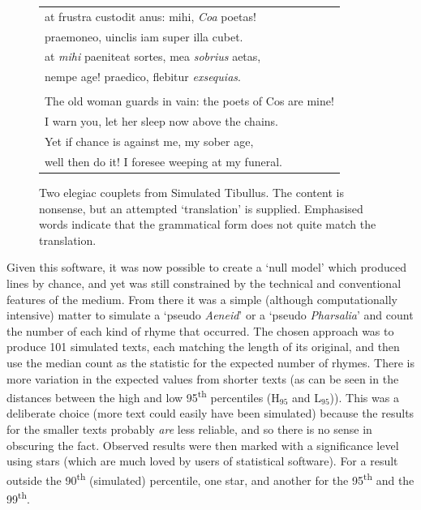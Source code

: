 \documentclass[twocolumn, switch]{article} %
\begin{document}
\begin{figure}[h!]
\caption{
Two elegiac couplets from Simulated Tibullus. The content is nonsense, but an
attempted `translation' is supplied. Emphasised words indicate that the
grammatical form does not quite match the translation.
}
\label{fig:ps_tib}
\par\medskip
\footnotesize
\centering
\begin{tabular}{l}
at frustra custodit anus: mihi, \emph{Coa} poetas!\\
\phantom{xx} praemoneo, uinclis iam super illa cubet.\\
at \emph{mihi} paeniteat sortes, mea \emph{sobrius} aetas,\\
\phantom{xx} nempe age! praedico, flebitur \emph{exsequias}.
\\
\phantom{xxx}\\
The old woman guards in vain: the poets of Cos are mine!\\
\phantom{xx} I warn you, let her sleep now above the chains.\\
Yet if chance is against me, my sober age,\\
\phantom{xx} well then do it! I foresee weeping at my funeral.\\
\end{tabular}
\end{figure}

Given this software, it was now possible to create a `null model' which
produced lines by chance, and yet was still constrained by the technical and
conventional features of the medium. From there it was a simple (although
computationally intensive) matter to simulate a `pseudo \emph{Aeneid}' or a
`pseudo \emph{Pharsalia}' and count the number of each kind of rhyme that
occurred. The chosen approach was to produce 101 simulated texts, each
matching the length of its original, and then use the median count as the
statistic for the expected number of rhymes. There is more variation in the
expected values from shorter texts (as can be seen in the distances between
the high and low 95\textsuperscript{th} percentiles (H$_{95}$ and L$_{95}$)).
This was a deliberate choice (more text could easily have been simulated)
because the results for the smaller texts probably \emph{are} less reliable,
and so there is no sense in obscuring the fact. Observed results were then
marked with a significance level using stars (which are much loved by users of
statistical software). For a result outside the 90\textsuperscript{th}
(simulated) percentile, one star, and another for the 95\textsuperscript{th}
and the 99\textsuperscript{th}.
\end{document}
